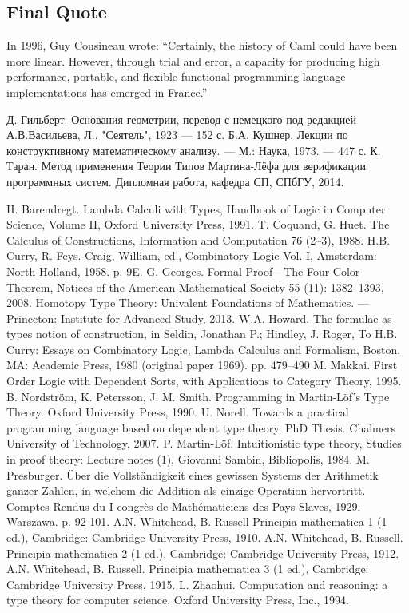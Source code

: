 \documentclass[14pt]{matmex-diploma-custom}
\begin{document}
\subsection{Final Quote}
In 1996, Guy Cousineau wrote: “Certainly, the history of Caml could have been more linear. However, through trial and error, a capacity for producing high performance, portable, and flexible functional programming language implementations has emerged in France.”

\newpage
\begin{thebibliography}{9}
    Д. Гильберт. Основания геометрии, перевод с немецкого под редакцией А.В.Васильева,
    Л., "Сеятель", 1923 — 152 с.
    Б.А. Кушнер. Лекции по конструктивному математическому анализу. — М.: Наука, 1973. — 447 с.
    К. Таран. Метод применения Теории Типов Мартина-Лёфа для верификации программных систем.
    Дипломная работа, кафедра СП, СПбГУ, 2014.
  
    H. Barendregt. Lambda Calculi with Types, Handbook of Logic in Computer Science, Volume II, Oxford University Press, 1991.
    T. Coquand, G. Huet. The Calculus of Constructions, Information and Computation 76 (2–3), 1988.
    H.B. Curry, R. Feys. Craig, William, ed., Combinatory Logic Vol. I, Amsterdam: North-Holland, 1958. p. 9E.
    G. Georges. Formal Proof—The Four-Color Theorem, Notices of the American Mathematical Society 55 (11): 1382–1393, 2008.
    Homotopy Type Theory: Univalent Foundations of Mathematics. — Princeton: Institute for Advanced Study, 2013.
    W.A. Howard. The formulae-as-types notion of construction, in Seldin, Jonathan P.; Hindley, J. Roger, To H.B. Curry: Essays on Combinatory Logic, Lambda Calculus and Formalism, Boston, MA: Academic Press, 1980 (original paper 1969). pp. 479–490
 M. Makkai. First Order Logic with Dependent Sorts, with Applications to Category Theory, 1995.
    B. Nordström, K. Petersson, J. M. Smith. Programming in Martin-Löf's Type Theory. Oxford University Press, 1990.
    U. Norell. Towards a practical programming language based on dependent type theory. PhD Thesis. Chalmers University of Technology, 2007.
   P. Martin-Löf. Intuitionistic type theory,
    Studies in proof theory: Lecture notes (1), Giovanni Sambin, Bibliopolis, 1984.
    M. Presburger. Über die Vollständigkeit eines gewissen Systems der Arithmetik ganzer Zahlen, in welchem die Addition als einzige Operation hervortritt. Comptes Rendus du I congrès de Mathématiciens des Pays Slaves, 1929.  Warszawa. p. 92-101.
    A.N. Whitehead, B. Russell Principia mathematica 1 (1 ed.), Cambridge: Cambridge University Press, 1910.
    A.N. Whitehead, B. Russell. Principia mathematica 2 (1 ed.), Cambridge: Cambridge University Press, 1912.
    A.N. Whitehead, B. Russell. Principia mathematica 3 (1 ed.), Cambridge: Cambridge University Press, 1915.
     L. Zhaohui. Computation and reasoning: a type theory for computer science. Oxford University Press, Inc., 1994.
\end{thebibliography}
\end{document}
